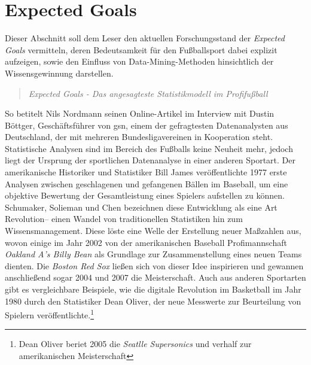 \section{Expected Goals}
\label{goals}
Dieser Abschnitt soll dem Leser den aktuellen Forschungsstand der \textit{Expected Goals} vermitteln, deren Bedeutsamkeit für den Fußballsport dabei explizit aufzeigen, sowie den Einfluss von Data-Mining-Methoden hinsichtlich der Wissensgewinnung darstellen.

\begin{quote}
\textit{\glqq Expected Goals - Das angesagteste Statistikmodell im Profifußball\grqq}
\end{quote}

So betitelt Nils Nordmann seinen Online-Artikel im Interview mit Dustin Böttger, Geschäftsführer von \gls{gsn}, einem der gefragtesten Datenanalysten aus Deutschland, der mit mehreren Bundesligavereinen in Kooperation steht. Statistische Analysen sind im Bereich des Fußballs keine Neuheit mehr, jedoch liegt der Ursprung der sportlichen Datenanalyse in einer anderen Sportart. Der amerikanische Historiker und Statistiker Bill James veröffentlichte 1977 erste Analysen zwischen geschlagenen und gefangenen Bällen im Baseball, um eine objektive Bewertung der Gesamtleistung eines Spielers aufstellen zu können. Schumaker, Solieman und Chen bezeichnen diese Entwicklung als eine Art \glqq Revolution\grqq-- einen Wandel von traditionellen Statistiken hin zum Wissensmanagement. Diese löste eine Welle der Erstellung neuer Maßzahlen aus, wovon einige im Jahr 2002 von der amerikanischen Baseball Profimannschaft \textit{Oakland A’s Billy Bean} als Grundlage zur Zusammenstellung eines neuen Teams dienten. Die \textit{Boston Red Sox} ließen sich von dieser Idee inspirieren und  gewannen anschließend sogar 2004 und 2007 die Meisterschaft. Auch aus anderen Sportarten gibt es vergleichbare Beispiele, wie die digitale Revolution im Basketball im Jahr 1980 durch den Statistiker Dean Oliver, der neue Messwerte zur Beurteilung von Spielern veröffentlichte.\footnote{Dean Oliver beriet 2005 die \textit{Seatlle Supersonics} und verhalf zur amerikanischen Meisterschaft}

